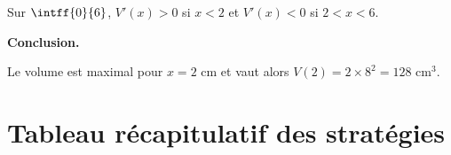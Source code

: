\begin{ex}
\begin{correction}
		Sur $\intff{0}{6}$, $V'(x) > 0$ si $x < 2$ et $V'(x) < 0$ si $2 < x < 6$.
		\begin{center}
		\end{center}

		\item \textbf{Conclusion.}

		Le volume est maximal pour $x = 2$ cm et vaut alors $V(2) = 2 \times 8^2 = 128$ cm$^3$.
	\end{correction}
\end{ex}

\section{Tableau récapitulatif des stratégies}

